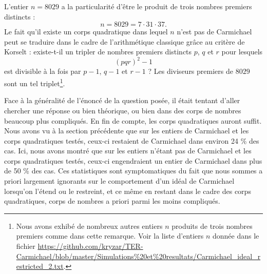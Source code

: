 \begin{remarque}
	L'entier $n = 8029$ a la particularité d'être le produit de trois nombres premiers distincts : \[n = 8029 = 7 \cdot 31 \cdot 37.\] Le fait qu'il existe un corps quadratique dans lequel $n$ n'est pas de Carmichael peut se traduire dans le cadre de l'arithmétique classique grâce au critère de Korselt : existe-t-il un tripler de nombres premiers distincts $p$, $q$ et $r$ pour lesquels \[(pqr)^2 - 1\] est divisible à la fois par $p-1$, $q-1$ et $r-1$ ? Les diviseurs premiers de $8029$ sont un tel triplet\footnote{Nous avons exhibé de nombreux autres entiers $n$ produits de trois nombres premiers comme dans cette remarque. Voir la liste d'entiers $n$ donnée dans le fichier \url{https://github.com/kryzar/TER-Carmichael/blob/master/Simulations\%20et\%20resultats/Carmichael\_ideal\_restricted\_2.txt}.}.
\end{remarque}

Face à la généralité de l'énoncé de la question posée, il était tentant d'aller chercher une réponse ou bien théorique, ou bien dans des corps de nombres beaucoup plus compliqués. En fin de compte, les corps quadratiques auront suffit. Nous avons vu à la section précédente que sur les entiers de Carmichael et les corps quadratiques testés, ceux-ci restaient de Carmichael dans environ 24 \% des cas. Ici, nous avons montré que sur les entiers n'étant pas de Carmichael et les corps quadratiques testés, ceux-ci engendraient un entier de Carmichael dans plus de 50 \% des cas. Ces statistiques sont symptomatiques du fait que nous sommes a priori largement ignorants sur le comportement d'un idéal de Carmichael lorsqu'on l'étend ou le restreint, et ce même en restant dans le cadre des corps quadratiques, corps de nombres a priori parmi les moins compliqués.
